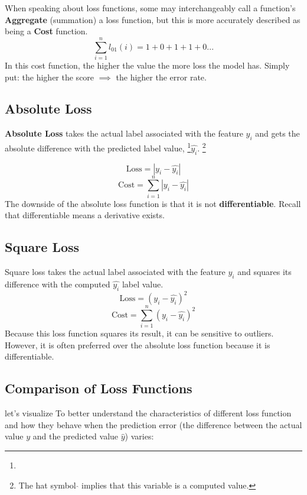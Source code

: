 When speaking about loss functions, some may interchangeably call a function's \textbf{Aggregate} (summation) a loss function, but this is more accurately described as being a \textbf{Cost} function.
\[ 
\sum_{i=1}^{n} l_{01}(i) = 1 + 0 + 1 + 1 + 0 . . . 
\]
In this cost function, the higher the value the more loss the model has. Simply put: the higher the score $\implies$ the higher the error rate. 

\subsection{Absolute Loss}
\textbf{Absolute Loss} takes the actual label associated with the feature $y_i$ and gets the absolute difference with the predicted label value, \footnote{}$\hat{y_i}$.
\footnote[1]{The hat symbol $\hat{}$ implies that this variable is a computed value.}

\[ 
\text{Loss}=|y_i - \hat{y_i}|
\]
\[ 
\text{Cost}=\sum_{i=1}^{n} |y_i - \hat{y_i}|
\]
The downside of the absolute loss function is that it is not \textbf{differentiable}. Recall that differentiable means a derivative exists.

\subsection{Square Loss}
Square loss takes the actual label associated with the feature $y_i$ and squares its difference with the computed $\hat{y_i}$ label value.
\[ 
\text{Loss}=(y_i - \hat{y_i})^2
\]
\[ 
\text{Cost}=\sum_{i=1}^{n} (y_i - \hat{y_i})^2
\]
Because this loss function squares its result, it can be sensitive to outliers. However, it is often preferred over the absolute loss function because it is differentiable.


\subsection{Comparison of Loss Functions}
let's visualize To better understand the characteristics of different loss function and how they behave when the prediction error (the difference between the actual value $y$ and the predicted value $\hat{y}$) varies:

